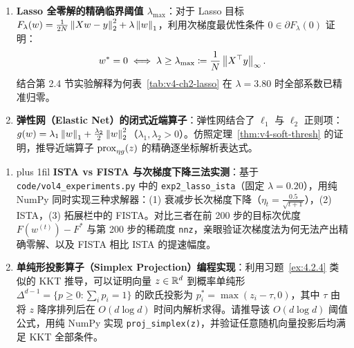 \begin{enumerate}[label=\textbf{4.2.\arabic*}, leftmargin=3.3em, itemsep=5pt, start=5]
  \item\label{ex:4.2.5} \textbf{Lasso 全零解的精确临界阈值 $\lambda_{\max}$}：对于 Lasso 目标 $F_\lambda(w) = \frac{1}{2N}\left\|Xw - y\right\|_2^2 + \lambda\left\|w\right\|_1$，利用次梯度最优性条件 $0 \in \partial F_\lambda(0)$ 证明：
  \[
    w^* = 0 \iff \lambda \ge \lambda_{\max} \coloneqq \frac{1}{N}\left\|X^\top y\right\|_\infty.
  \]
  结合第 2.4 节实验解释为何表~\ref{tab:v4-ch2-lasso} 在 $\lambda = 3.80$ 时全部系数已精准归零。

  \item\label{ex:4.2.6} \textbf{弹性网（Elastic Net）的闭式近端算子}：弹性网结合了 $\ell_1$ 与 $\ell_2$ 正则项：$g(w) = \lambda_1\left\|w\right\|_1 + \frac{\lambda_2}{2}\left\|w\right\|_2^2$（$\lambda_1, \lambda_2 > 0$）。仿照定理~\ref{thm:v4-soft-thresh} 的证明，推导近端算子 $\operatorname{prox}_{\eta g}(z)$ 的精确逐坐标解析表达式。
\end{enumerate}

\begin{enumerate}[label=\textbf{4.2.\arabic*}, leftmargin=3.3em, itemsep=5pt, start=7]
  \item{\rightskip=0pt plus 1fil\relax \label{ex:4.2.7} \textbf{ISTA vs FISTA 与次梯度下降三法实测}：基于 \texttt{code/vol4\_experiments.py} 中的 \texttt{exp2\_lasso\_ista}（固定 $\lambda = 0.20$），用纯 NumPy 同时实现三种求解器：(1) 衰减步长次梯度下降（$\eta_t = \frac{0.5}{\sqrt{t+1}}$），(2) ISTA，(3) 拓展栏中的 FISTA。对比三者在前 200 步的目标次优度 $F(w^{(t)}) - F^*$ 与第 200 步的稀疏度 \texttt{nnz}，亲眼验证次梯度法为何无法产出精确零解、以及 FISTA 相比 ISTA 的提速幅度。\par}

  \item\label{ex:4.2.8} \textbf{单纯形投影算子（Simplex Projection）编程实现}：利用习题~\ref{ex:4.2.4} 类似的 KKT 推导，可以证明向量 $z \in \mathbb{R}^d$ 到概率单纯形 $\Delta^{d-1} = \{p \ge 0 : \sum_i p_i = 1\}$ 的欧氏投影为 $p_i^* = \max(z_i - \tau, 0)$，其中 $\tau$ 由将 $z$ 降序排列后在 $O(d\log d)$ 时间内解析求得。请推导该 $O(d\log d)$ 阈值公式，用纯 NumPy 实现 \texttt{proj\_simplex(z)}，并验证任意随机向量投影后均满足 KKT 全部条件。
\end{enumerate}
